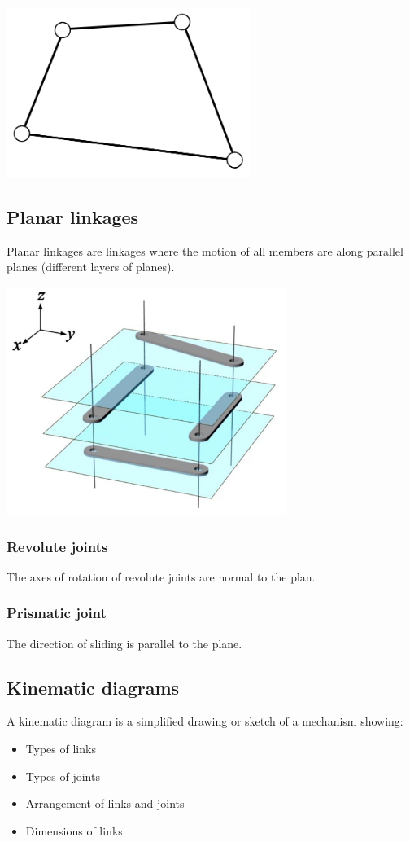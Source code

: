 \documentclass[11pt]{article}
\begin{document}
\begin{center}
\includegraphics[height=15em]{./images/closed-loop-linkage-image.png}
\end{center}
\subsection{Planar linkages}
\label{sec:org40271aa}
Planar linkages are linkages where the motion of all members are along parallel planes (different layers of planes).

\begin{center}
\includegraphics[height=20em]{./images/planar-linkages-image.png}
\end{center}
\subsubsection{Revolute joints}
\label{sec:org609c6dd}
The axes of rotation of revolute joints are normal to the plan.
\subsubsection{Prismatic joint}
\label{sec:org3bff2d6}
The direction of sliding is parallel to the plane.
\subsection{Kinematic diagrams}
\label{sec:org33e45db}
A kinematic diagram is a simplified drawing or sketch of a mechanism showing:
\begin{itemize}
\item Types of links
\item Types of joints
\item Arrangement of links and joints
\item Dimensions of links
\end{itemize}
\end{document}

